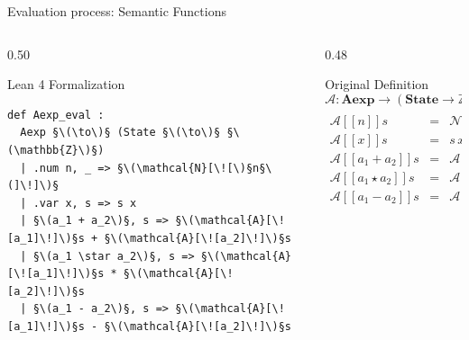 \documentclass[xcolor={dvipsnames,table}]{beamer}
\begin{document}
\begin{frame}[fragile]{Evaluation process: \alert{Semantic Functions}}

    \begin{columns}[T]
        
        \begin{column}{0.50\textwidth}
            \begin{block}{Lean 4 Formalization}
                \begin{lstlisting}[style=lean4, basicstyle=\scriptsize\ttfamily]
def Aexp_eval :
  Aexp §\(\to\)§ (State §\(\to\)§ §\(\mathbb{Z}\)§)
  | .num n, _ => §\(\mathcal{N}[\![\)§n§\(]\!]\)§
  | .var x, s => s x
  | §\(a_1 + a_2\)§, s => §\(\mathcal{A}[\![a_1]\!]\)§s + §\(\mathcal{A}[\![a_2]\!]\)§s
  | §\(a_1 \star a_2\)§, s => §\(\mathcal{A}[\![a_1]\!]\)§s * §\(\mathcal{A}[\![a_2]\!]\)§s
  | §\(a_1 - a_2\)§, s => §\(\mathcal{A}[\![a_1]\!]\)§s - §\(\mathcal{A}[\![a_2]\!]\)§s
                \end{lstlisting}
            \end{block}
        \end{column}

        \begin{column}{0.48\textwidth}
            \begin{block}{Original Definition}
\scriptsize
\[
\mathcal{A}: \mathbf{Aexp} \to (\mathbf{State} \to \mathbb{Z})
\]
\[
\begin{array}{lcl}
        \\
        \mathcal{A}[\![n]\!]s &=& \mathcal{N}[\![n]\!] \\
        \mathcal{A}[\![x]\!]s &=& s \, x \\
        \mathcal{A}[\![a_1 + a_2]\!]s &=& \mathcal{A}[\![a_1]\!]s + \mathcal{A}[\![a_2]\!]s \\
        \mathcal{A}[\![a_1 \star a_2]\!]s &=& \mathcal{A}[\![a_1]\!]s \cdot \mathcal{A}[\![a_2]\!]s \\
        \mathcal{A}[\![a_1 - a_2]\!]s &=& \mathcal{A}[\![a_1]\!]s - \mathcal{A}[\![a_2]\!]s
\end{array}
\]
            \end{block}
        \end{column}
        
    \end{columns}
\end{frame}
\end{document}
